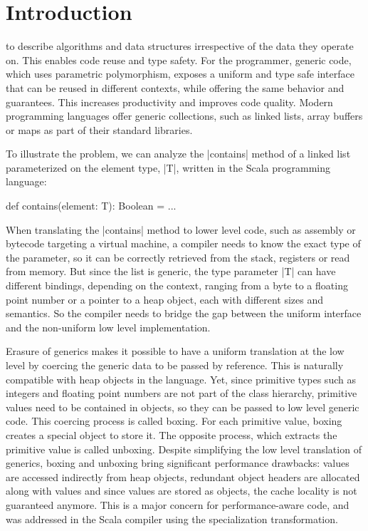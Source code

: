 \section{Introduction}

 to describe algorithms and data structures irrespective of the data they operate on. This enables code reuse and type safety. For the programmer, generic code, which uses parametric polymorphism, exposes a uniform and type safe interface that can be reused in different contexts, while offering the same behavior and guarantees. This increases productivity and improves code quality. Modern programming languages offer generic collections, such as linked lists, array buffers or maps as part of their standard libraries.

 To illustrate the problem, we can analyze the |contains| method of a linked list parameterized on the element type, |T|, written in the Scala programming language:

\begin{lstlisting-nobreak}
 def contains(element: T): Boolean = ...
\end{lstlisting-nobreak}

When translating the |contains| method to lower level code, such as assembly or bytecode targeting a virtual machine, a compiler needs to know the exact type of the parameter, so it can be correctly retrieved from the stack, registers or read from memory. But since the list is generic, the type parameter |T| can have different bindings, depending on the context, ranging from a byte to a floating point number or a pointer to a heap object, each with different sizes and semantics. So the compiler needs to bridge the gap between the uniform interface and the non-uniform low level implementation.

 Erasure of generics makes it possible to have a uniform translation at the low level by coercing the generic data to be passed by reference. This is naturally compatible with heap objects in the language. Yet, since primitive types such as integers and floating point numbers are not part of the class hierarchy, primitive values need to be contained in objects, so they can be passed to low level generic code. This coercing process is called boxing. For each primitive value, boxing creates a special object to store it. The opposite process, which extracts the primitive value is called unboxing. Despite simplifying the low level translation of generics, boxing and unboxing bring significant performance drawbacks: values are accessed indirectly from heap objects, redundant object headers are allocated along with values and since values are stored as objects, the cache locality is not guaranteed anymore. This is a major concern for performance-aware code, and was addressed in the Scala compiler using the specialization transformation.


